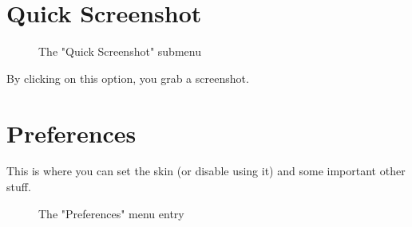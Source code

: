 \documentclass[10pt]{report}
\begin{document}
\section{Quick Screenshot}
\begin{figure}[H]
\centering
{}
\caption{The "Quick Screenshot" submenu}
\end{figure}
By clicking on this option, you grab a screenshot.\newline


\section{Preferences}

This is where you can set the skin (or disable using it) and some important other stuff.\newline
\begin{figure}[H]
\centering
{}
\caption{The "Preferences" menu entry}
\end{figure}
\end{document}
